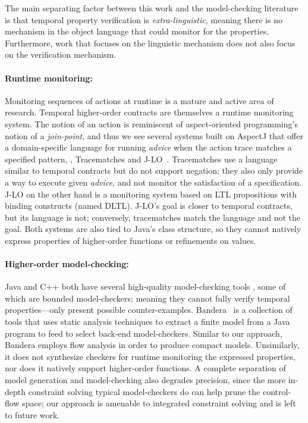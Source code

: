 The main separating factor between this work and the model-checking literature is that temporal property verification is \emph{extra-linguistic}, meaning there is no mechanism in the object language that could monitor for the properties.
%
Furthermore, work that focuses on the linguistic mechanism does not also focus on the verification mechanism.

\paragraph{Runtime monitoring:}
Monitoring sequences of actions at runtime is a mature and active area of research.
%
Temporal higher-order contracts are themselves a runtime monitoring system.
%
The notion of an action is reminiscent of aspect-oriented programming's notion of a \emph{join-point}, and thus we see several systems built on AspectJ \citep{ianjohnson:aspectj} that offer a domain-specific language for running \emph{advice} when the action trace matches a specified pattern, \eg, Tracematches \citep{ianjohnson:Allan05addingtrace} and J-LO~\citep{ianjohnson:jlo}.
%
Tracematches use a language similar to temporal contracts but do not support negation; they also only provide a way to execute given \emph{advice}, and not monitor the satisfaction of a specification.
%
J-LO on the other hand is a monitoring system based on LTL propositions with binding constructs (named DLTL).
%
J-LO's goal is closer to temporal contracts, but its language is not; conversely, tracematches match the language and not the goal.
%
Both systems are also tied to Java's class structure, so they cannot natively express properties of higher-order functions or refinements on values.

\paragraph{Higher-order model-checking:}
Java and C++ both have several high-quality model-checking tools \citep{ianjohnson:bandera, ianjohnson:java-pathfinder, ianjohnson:LLBMC}, some of which are bounded model-checkers; meaning they cannot fully verify temporal properties---only present possible counter-examples.
%
Bandera~\citep{ianjohnson:bandera} is a collection of tools that uses static analysis techniques to extract a finite model from a Java program to feed to select back-end model-checkers.
%
Similar to our approach, Bandera employs flow analysis in order to produce compact models.
%
Unsimilarly, it does not synthesize checkers for runtime monitoring the expressed properties, nor does it natively support higher-order functions.
%
A complete separation of model generation and model-checking also degrades precision, since the more in-depth constraint solving typical model-checkers do can help prune the control-flow space; our approach is amenable to integrated constraint solving and is left to future work.

